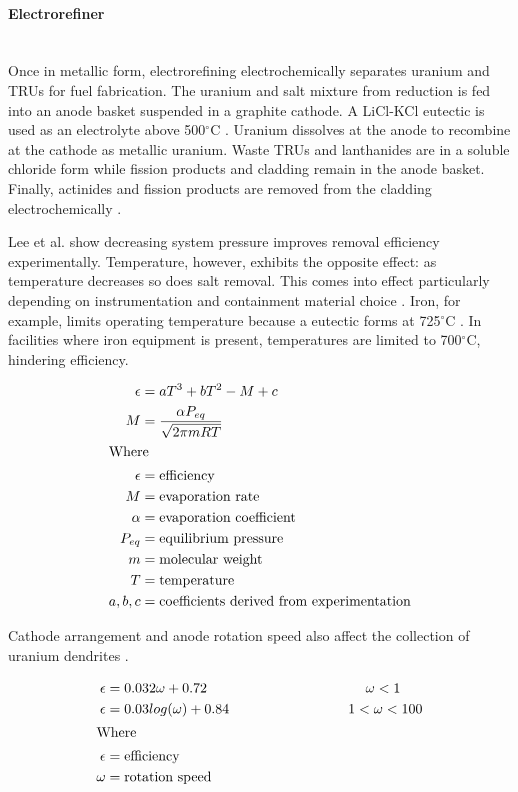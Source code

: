 \paragraph{Electrorefiner} \mbox{}\\
Once in metallic form, electrorefining electrochemically separates uranium and TRUs for fuel fabrication.
The uranium and salt mixture from reduction is fed into an anode basket suspended in a graphite cathode. 
A LiCl-KCl eutectic is used as an electrolyte above 500$^{\circ}$C \cite{flowsheet_1998,lee_korean_2011}. 
Uranium dissolves at the anode to recombine at the cathode as metallic uranium.
Waste TRUs and lanthanides are in a soluble chloride form  while fission products and cladding remain in the anode
basket. Finally, actinides and fission products are removed from the cladding electrochemically \cite{lee_korean_2011}.

Lee et al. \cite{lee_advanced_2008} show decreasing system pressure improves removal efficiency experimentally.
Temperature, however, exhibits the opposite effect: as temperature decreases so does salt removal. This comes into effect 
particularly depending on instrumentation and containment material choice \cite{lee_advanced_2008}. 
Iron, for example, limits operating temperature because a eutectic forms at 725$^{\circ}$C \cite{chapman_revision_1984}.
In facilities where iron equipment is present, temperatures are limited to 700$^{\circ}$C, hindering efficiency.

\begin{align}
\epsilon &= aT^3 + bT^2 - M + c \\
M &= \frac{\alpha P_{eq}}{\sqrt{2\pi mRT}} \\
\intertext{Where}
\epsilon &= \mbox{efficiency} \nonumber \\
M &= \mbox{evaporation rate} \nonumber \\
\alpha &= \mbox{evaporation coefficient} \nonumber \\
P_{eq} &= \mbox{equilibrium pressure} \nonumber \\
m &= \mbox{molecular weight} \nonumber \\
T &= \mbox{temperature} \nonumber \\
a,b,c &= \mbox{coefficients derived from experimentation} \nonumber
\end{align}

Cathode arrangement and anode rotation speed also affect the collection of uranium 
dendrites \cite{lee_advanced_2008}.

\begin{align}
\epsilon &= 0.032 \omega + 0.72		\mbox{\hspace{40mm}}	\omega < 1 \\
\epsilon &= 0.03 log(\omega) + 0.84		\mbox{\hspace{30mm}}	1 < \omega < 100 \\
\intertext{Where}
\epsilon &= \mbox{efficiency} \nonumber \\
\omega &= \mbox{rotation speed} \nonumber
\end{align}

